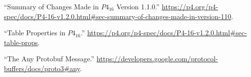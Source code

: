 \documentclass[11pt]{article}
\begin{document}
{{\begin{thebibliography}{37}
\mdbibitemlabel{{}[28]}\textquotedblleft{}Summary of Changes Made in $P4_{16}$ Version 1.1.0.\textquotedblright{} \href{https://p4.org/p4-spec/docs/P4-16-v1.2.0.html\%23sec-summary-of-changes-made-in-version-110}{{\ttfamily https://\hspace{0pt}p4.\hspace{0pt}org/\hspace{0pt}p4-\hspace{0pt}spec/\hspace{0pt}docs/\hspace{0pt}P4-\hspace{0pt}16-\hspace{0pt}v1.\hspace{0pt}2.\hspace{0pt}0.\hspace{0pt}html\#\hspace{0pt}sec-\hspace{0pt}summary-\hspace{0pt}of-\hspace{0pt}changes-\hspace{0pt}made-\hspace{0pt}in-\hspace{0pt}version-\hspace{0pt}110}}.\label{p4revisions110}%

\mdbibitemlabel{{}[29]}\textquotedblleft{}Table Properties in $P4_{16}$.\textquotedblright{} \href{https://p4.org/p4-spec/docs/P4-16-v1.2.0.html\%23sec-table-props}{{\ttfamily https://\hspace{0pt}p4.\hspace{0pt}org/\hspace{0pt}p4-\hspace{0pt}spec/\hspace{0pt}docs/\hspace{0pt}P4-\hspace{0pt}16-\hspace{0pt}v1.\hspace{0pt}2.\hspace{0pt}0.\hspace{0pt}html\#\hspace{0pt}sec-\hspace{0pt}table-\hspace{0pt}props}}.\label{p4tableproperties}%

\mdbibitemlabel{{}[30]}\textquotedblleft{}The Any Protobuf Message.\textquotedblright{} \href{https://developers.google.com/protocol-buffers/docs/proto3\%23any}{{\ttfamily https://\hspace{0pt}developers.\hspace{0pt}google.\hspace{0pt}com/\hspace{0pt}protocol-\hspace{0pt}buffers/\hspace{0pt}docs/\hspace{0pt}proto3\#\hspace{0pt}any}}.\label{protoany}%


\end{thebibliography}}}
\end{document}
